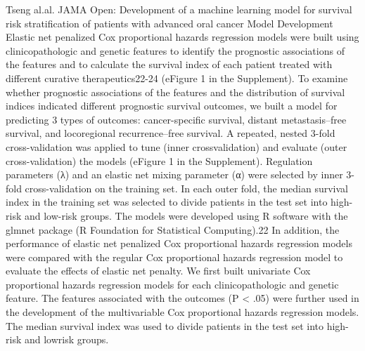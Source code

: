 \documentclass{article}%
\begin{document}
%
%
\newline%
\newline%
%
Tseng al.al. JAMA Open: Development of a machine learning model for survival risk stratification of patients with advanced oral cancer %
\newline%
\newline%
%
%
\newline%
\newline%
%
%
\newline%
\newline%
%
%
\newline%
\newline%
%
%
\newline%
\newline%
%
Model Development Elastic net penalized Cox proportional hazards regression models were built using clinicopathologic and genetic features to identify the prognostic associations of the features and to calculate the survival index of each patient treated with different curative therapeutics22{-}24 (eFigure 1 in the Supplement). To examine whether prognostic associations of the features and the distribution of survival indices indicated different prognostic survival outcomes, we built a model for predicting 3 types of outcomes: cancer{-}specific survival, distant metastasis–free survival, and locoregional recurrence–free survival. A repeated, nested 3{-}fold cross{-}validation was applied to tune (inner crossvalidation) and evaluate (outer cross{-}validation) the models (eFigure 1 in the Supplement). Regulation parameters (λ) and an elastic net mixing parameter (α) were selected by inner 3{-}fold cross{-}validation on the training set. In each outer fold, the median survival index in the training set was selected to divide patients in the test set into high{-}risk and low{-}risk groups. The models were developed using R software with the glmnet package (R Foundation for Statistical Computing).22 In addition, the performance of elastic net penalized Cox proportional hazards regression models were compared with the regular Cox proportional hazards regression model to evaluate the effects of elastic net penalty. We first built univariate Cox proportional hazards regression models for each clinicopathologic and genetic feature. The features associated with the outcomes (P < .05) were further used in the development of the multivariable Cox proportional hazards regression models. The median survival index was used to divide patients in the test set into high{-}risk and lowrisk groups.%
\newline%
\end{document}
